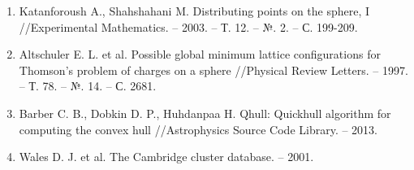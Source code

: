 \begin{enumerate}[leftmargin=0.5cm,topsep=0pt,itemsep=-1ex,partopsep=1ex,parsep=1ex,ref=\arabic{*},label=\arabic{*}.]
\item\label{bib:Katanforoush}
Katanforoush A., Shahshahani M. Distributing points on the sphere, I //Ex\-pe\-ri\-men\-tal Mathematics. – 2003. – Т. 12. – №. 2. – С. 199-209.

\item\label{bib:Altschuler}
Altschuler E. L. et al. Possible global minimum lattice configurations for Thomson's problem of charges on a sphere //Physical Review Letters. – 1997. – Т. 78. – №. 14. – С. 2681.

\item\label{bib:Barber}
Barber C. B., Dobkin D. P., Huhdanpaa H. Qhull: Quickhull algorithm for computing the convex hull //Astrophysics Source Code Library. – 2013.

\item\label{bib:Wales}
Wales D. J. et al. The Cambridge cluster database. – 2001.

\end{enumerate}

